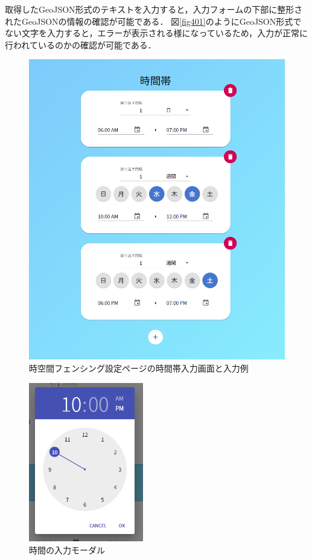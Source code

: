 取得したGeoJSON形式のテキストを入力すると，入力フォームの下部に整形されたGeoJSONの情報の確認が可能である．
図\ref{fig401}のようにGeoJSON形式でない文字を入力すると，エラーが表示される様になっているため，入力が正常に行われているのかの確認が可能である．

\begin{figure}[H]
  \centering
  \includegraphics[width=120mm]{timeInput.png}
  \caption{時空間フェンシング設定ページの時間帯入力画面と入力例}
  \label{timeInput}
\end{figure}


\begin{figure}[H]
  \centering
  \includegraphics[width=50mm]{timeModal.png}
  \caption{時間の入力モーダル}
  \label{timeModal}
\end{figure}

